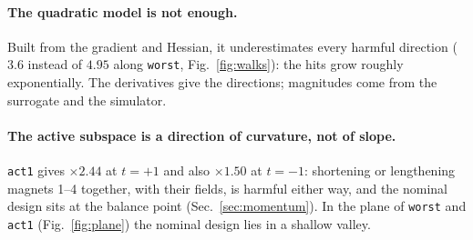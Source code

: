 \documentclass[11pt,a4paper]{article}
\begin{document}
\paragraph{The quadratic model is not enough.}
Built from the gradient and Hessian, it underestimates every harmful direction ($3.6$ instead of
$4.95$ along \texttt{worst}, Fig.~\ref{fig:walks}): the hits grow roughly exponentially. The
derivatives give the directions; magnitudes come from the surrogate and the simulator.

\paragraph{The active subspace is a direction of curvature, not of slope.}
\texttt{act1} gives $\times2.44$ at $t=+1$ and also $\times1.50$ at $t=-1$: shortening or
lengthening magnets 1--4 together, with their fields, is harmful either way, and the nominal
design sits at the balance point (Sec.~\ref{sec:momentum}). In the plane of \texttt{worst} and
\texttt{act1} (Fig.~\ref{fig:plane}) the nominal design lies in a shallow valley.
\end{document}
